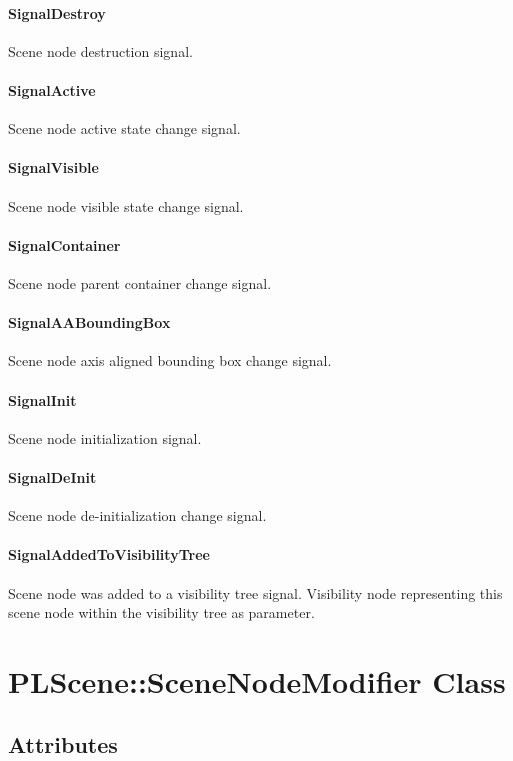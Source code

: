 \paragraph{SignalDestroy}
Scene node destruction signal.

\paragraph{SignalActive}
Scene node active state change signal.

\paragraph{SignalVisible}
Scene node visible state change signal.

\paragraph{SignalContainer}
Scene node parent container change signal.

\paragraph{SignalAABoundingBox}
Scene node axis aligned bounding box change signal.

\paragraph{SignalInit}
Scene node initialization signal.

\paragraph{SignalDeInit}
Scene node de-initialization change signal.

\paragraph{SignalAddedToVisibilityTree}
Scene node was added to a visibility tree signal. Visibility node representing this scene node within the visibility tree as parameter.




\section{PLScene::SceneNodeModifier Class}


\subsection{Attributes}

